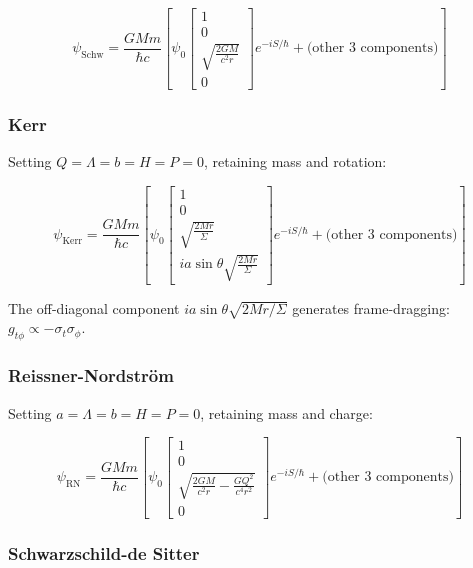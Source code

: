 \documentclass[11pt,a4paper]{article}
\theoremstyle{definition}
\theoremstyle{remark}
\begin{document}
	\begin{equation}
		\psi_{\text{Schw}} = \frac{GMm}{\hbar c}\left[\psi_0 \begin{bmatrix} 1 \\ 0 \\ \sqrt{\frac{2GM}{c^2r}} \\ 0 \end{bmatrix} e^{-iS/\hbar} + \text{(other 3 components)}\right]
		\label{eq:psi_schwarzschild}
	\end{equation}
	
	\subsubsection{Kerr}
	
	Setting $Q = \Lambda = b = H = P = 0$, retaining mass and rotation:
	
	\begin{equation}
		\psi_{\text{Kerr}} = \frac{GMm}{\hbar c}\left[\psi_0 \begin{bmatrix} 1 \\ 0 \\ \sqrt{\frac{2Mr}{\Sigma}} \\ ia\sin\theta\sqrt{\frac{2Mr}{\Sigma}} \end{bmatrix} e^{-iS/\hbar} + \text{(other 3 components)}\right]
		\label{eq:psi_kerr}
	\end{equation}
	
	The off-diagonal component $ia\sin\theta\sqrt{2Mr/\Sigma}$ generates frame-dragging: $g_{t\phi} \propto -\sigma_t\sigma_\phi$.
	
	\subsubsection{Reissner-Nordström}
	
	Setting $a = \Lambda = b = H = P = 0$, retaining mass and charge:
	
	\begin{equation}
		\psi_{\text{RN}} = \frac{GMm}{\hbar c}\left[\psi_0 \begin{bmatrix} 1 \\ 0 \\ \sqrt{\frac{2GM}{c^2r} - \frac{GQ^2}{c^4r^2}} \\ 0 \end{bmatrix} e^{-iS/\hbar} + \text{(other 3 components)}\right]
		\label{eq:psi_rn}
	\end{equation}
	
	\subsubsection{Schwarzschild-de Sitter}
	
\end{document}
